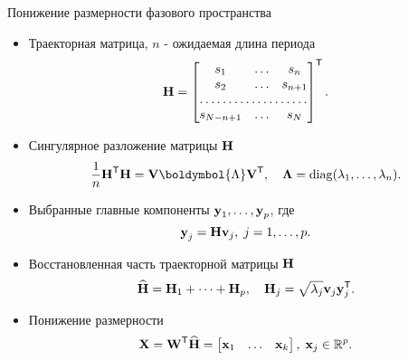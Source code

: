 \documentclass{beamer}
\newcommand{\diag}{\mathop{\mathrm{diag}}}
\begin{document}

\begin{frame}{Понижение размерности фазового пространства}
\begin{itemize}
    \item[] Траекторная матрица, $n$ - ожидаемая длина периода
        \[ \mbox{\bfseries H} = \begin{bmatrix}
                        s_1 & \dots & s_n \\
                        s_2 & \dots & s_{n+1} \\
                        \hdotsfor{3} \\
                        s_{N-n+1} & \dots & s_{N}
                        \end{bmatrix}^{\mathsf{T}}.\]
    \item[] Сингулярное разложение матрицы $\mbox{\bfseries H}$
        \[ \frac{1}{n}\mbox{\bfseries H}^{\mathsf{T}}\mbox{\bfseries H} = \mbox{\bfseries V} \boldymbol{\Lambda}\mbox{\bfseries V}^{\mathsf{T}}, \quad \boldsymbol{\Lambda} = \diag(\lambda_1,\dots,\lambda_{n}). \]
    \item[] Выбранные главные компоненты $\mbox{\bfseries y}_1, \dots, \mbox{\bfseries y}_p$, где \[\mbox{\bfseries y}_j = \mbox{\bfseries H}\mbox{\bfseries v}_j, \; j = 1,\dots, p.\]
    \item[] Восстановленная часть траекторной матрицы $\mbox{\bfseries H}$
        \[ \widehat{\mbox{\bfseries H}} = \mbox{\bfseries H}_1  + \dots + \mbox{\bfseries H}_p, \quad \mbox{\bfseries H}_j = \sqrt{\lambda_j}\mbox{\bfseries v}_j\mbox{\bfseries y}_j^{\mathsf{T}}.\]
    \item[] Понижение размерности \[\mbox{\bfseries X} = \mbox{\bfseries W}^{\mathsf{T}}\widehat{\mbox{\bfseries H}}  = \begin{bmatrix} \mbox{\bfseries x}_1 & \dots & \mbox{\bfseries x}_{k} \end{bmatrix}, \;\mbox{\bfseries x}_{j}\in  \mathbb{R}^p.  \]
\end{itemize}

\end{frame}

\end{document}
